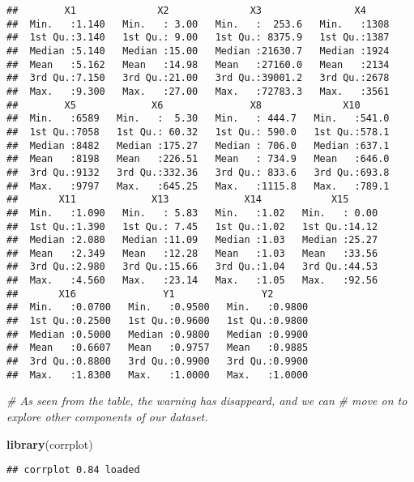 \documentclass[
]{article}
\newenvironment{Shaded}{\begin{snugshade}}{\end{snugshade}}
\newcommand{\CommentTok}[1]{\textcolor[rgb]{0.56,0.35,0.01}{\textit{#1}}}
\newcommand{\KeywordTok}[1]{\textcolor[rgb]{0.13,0.29,0.53}{\textbf{#1}}}
\newcommand{\NormalTok}[1]{#1}
\begin{document}
\begin{verbatim}
##        X1              X2              X3                X4      
##  Min.   :1.140   Min.   : 3.00   Min.   :  253.6   Min.   :1308  
##  1st Qu.:3.140   1st Qu.: 9.00   1st Qu.: 8375.9   1st Qu.:1387  
##  Median :5.140   Median :15.00   Median :21630.7   Median :1924  
##  Mean   :5.162   Mean   :14.98   Mean   :27160.0   Mean   :2134  
##  3rd Qu.:7.150   3rd Qu.:21.00   3rd Qu.:39001.2   3rd Qu.:2678  
##  Max.   :9.300   Max.   :27.00   Max.   :72783.3   Max.   :3561  
##        X5             X6               X8              X10       
##  Min.   :6589   Min.   :  5.30   Min.   : 444.7   Min.   :541.0  
##  1st Qu.:7058   1st Qu.: 60.32   1st Qu.: 590.0   1st Qu.:578.1  
##  Median :8482   Median :175.27   Median : 706.0   Median :637.1  
##  Mean   :8198   Mean   :226.51   Mean   : 734.9   Mean   :646.0  
##  3rd Qu.:9132   3rd Qu.:332.36   3rd Qu.: 833.6   3rd Qu.:693.8  
##  Max.   :9797   Max.   :645.25   Max.   :1115.8   Max.   :789.1  
##       X11             X13             X14            X15       
##  Min.   :1.090   Min.   : 5.83   Min.   :1.02   Min.   : 0.00  
##  1st Qu.:1.390   1st Qu.: 7.45   1st Qu.:1.02   1st Qu.:14.12  
##  Median :2.080   Median :11.09   Median :1.03   Median :25.27  
##  Mean   :2.349   Mean   :12.28   Mean   :1.03   Mean   :33.56  
##  3rd Qu.:2.980   3rd Qu.:15.66   3rd Qu.:1.04   3rd Qu.:44.53  
##  Max.   :4.560   Max.   :23.14   Max.   :1.05   Max.   :92.56  
##       X16               Y1               Y2        
##  Min.   :0.0700   Min.   :0.9500   Min.   :0.9800  
##  1st Qu.:0.2500   1st Qu.:0.9600   1st Qu.:0.9800  
##  Median :0.5000   Median :0.9800   Median :0.9900  
##  Mean   :0.6607   Mean   :0.9757   Mean   :0.9885  
##  3rd Qu.:0.8800   3rd Qu.:0.9900   3rd Qu.:0.9900  
##  Max.   :1.8300   Max.   :1.0000   Max.   :1.0000
\end{verbatim}

\begin{Shaded}
\begin{Highlighting}[]
\CommentTok{# As seen from the table, the warning has disappeard, and we can }
\CommentTok{# move on to explore other components of our dataset.}

\KeywordTok{library}\NormalTok{(corrplot)}
\end{Highlighting}
\end{Shaded}

\begin{verbatim}
## corrplot 0.84 loaded
\end{verbatim}
\end{document}
